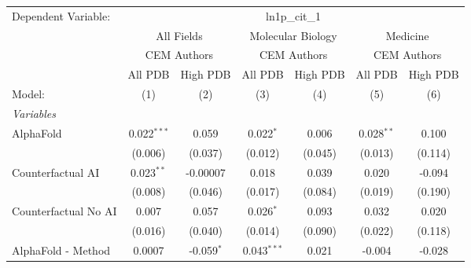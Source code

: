 \begingroup
\centering
\begin{tabular}{lcccccc}
   \tabularnewline \midrule \midrule
   Dependent Variable: & \multicolumn{6}{c}{ln1p\_cit\_1}\\
 & \multicolumn{2}{c}{All Fields} & \multicolumn{2}{c}{Molecular Biology} & \multicolumn{2}{c}{Medicine} \\
\cmidrule(lr){2-3} \cmidrule(lr){4-5} \cmidrule(lr){6-7}
 & \multicolumn{2}{c}{CEM Authors} & \multicolumn{2}{c}{CEM Authors} & \multicolumn{2}{c}{CEM Authors} \\
\cmidrule(lr){2-3} \cmidrule(lr){4-5} \cmidrule(lr){6-7}
 & \multicolumn{1}{c}{All PDB} & \multicolumn{1}{c}{High PDB} & \multicolumn{1}{c}{All PDB} & \multicolumn{1}{c}{High PDB} & \multicolumn{1}{c}{All PDB} & \multicolumn{1}{c}{High PDB} \\
\cmidrule(lr){2-2} \cmidrule(lr){3-3} \cmidrule(lr){4-4} \cmidrule(lr){5-5} \cmidrule(lr){6-6} \cmidrule(lr){7-7}
   Model:                                                     & (1)            & (2)          & (3)           & (4)         & (5)            & (6)\\  
   \midrule
   \emph{Variables}\\
   AlphaFold                                                  & 0.022$^{***}$  & 0.059        & 0.022$^{*}$   & 0.006       & 0.028$^{**}$   & 0.100\\   
                                                              & (0.006)        & (0.037)      & (0.012)       & (0.045)     & (0.013)        & (0.114)\\   
   Counterfactual AI                                          & 0.023$^{**}$   & -0.00007     & 0.018         & 0.039       & 0.020          & -0.094\\   
                                                              & (0.008)        & (0.046)      & (0.017)       & (0.084)     & (0.019)        & (0.190)\\   
   Counterfactual No AI                                       & 0.007          & 0.057        & 0.026$^{*}$   & 0.093       & 0.032          & 0.020\\   
                                                              & (0.016)        & (0.040)      & (0.014)       & (0.090)     & (0.022)        & (0.118)\\   
   AlphaFold - Method                                         & 0.0007         & -0.059$^{*}$ & 0.043$^{***}$ & 0.021       & -0.004         & -0.028\\   

\end{tabular}
